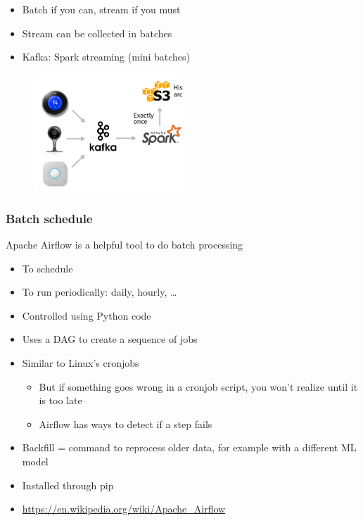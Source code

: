 \documentclass{article}
\begin{document}
\begin{itemize}
    \item Batch if you can, stream if you must
    \item Stream can be collected in batches
    \item Kafka: Spark streaming (mini batches)
\end{itemize}

\begin{figure}[H]
    \centering
    \includegraphics[width=0.5\textwidth]{batch-vs-stream-kafka-spark.png}
\end{figure}

\subsubsection{Batch schedule}

Apache Airflow is a helpful tool to do batch processing

\begin{itemize}
    \item To schedule
    \item To run periodically: daily, hourly, \dots
    \item Controlled using Python code
    \item Uses a DAG to create a sequence of jobs
    \item Similar to Linux's cronjobs
    \begin{itemize}
        \item But if something goes wrong in a cronjob script, you won't realize until it is too late
        \item Airflow has ways to detect if a step fails
    \end{itemize}
    \item Backfill = command to reprocess older data, for example with a different ML model
    \item Installed through pip
    \item \url{https://en.wikipedia.org/wiki/Apache_Airflow}
\end{itemize}
\end{document}
